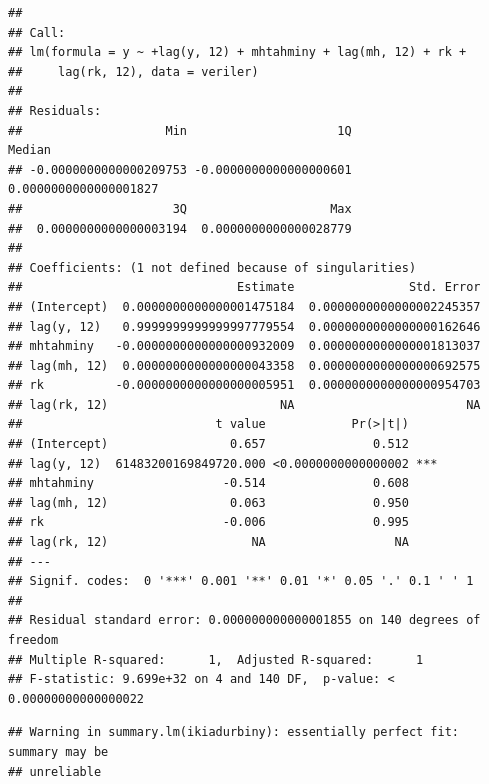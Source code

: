 \documentclass[]{article}
\newenvironment{Shaded}{\begin{snugshade}}{\end{snugshade}}
\newcommand{\KeywordTok}[1]{\textcolor[rgb]{0.13,0.29,0.53}{\textbf{#1}}}
\newcommand{\DecValTok}[1]{\textcolor[rgb]{0.00,0.00,0.81}{#1}}
\newcommand{\StringTok}[1]{\textcolor[rgb]{0.31,0.60,0.02}{#1}}
\newcommand{\OperatorTok}[1]{\textcolor[rgb]{0.81,0.36,0.00}{\textbf{#1}}}
\newcommand{\NormalTok}[1]{#1}
\begin{document}
\begin{verbatim}
## 
## Call:
## lm(formula = y ~ +lag(y, 12) + mhtahminy + lag(mh, 12) + rk + 
##     lag(rk, 12), data = veriler)
## 
## Residuals:
##                    Min                     1Q                 Median 
## -0.0000000000000209753 -0.0000000000000000601  0.0000000000000001827 
##                     3Q                    Max 
##  0.0000000000000003194  0.0000000000000028779 
## 
## Coefficients: (1 not defined because of singularities)
##                              Estimate                Std. Error
## (Intercept)  0.0000000000000001475184  0.0000000000000002245357
## lag(y, 12)   0.9999999999999997779554  0.0000000000000000162646
## mhtahminy   -0.0000000000000000932009  0.0000000000000001813037
## lag(mh, 12)  0.0000000000000000043358  0.0000000000000000692575
## rk          -0.0000000000000000005951  0.0000000000000000954703
## lag(rk, 12)                        NA                        NA
##                           t value            Pr(>|t|)    
## (Intercept)                 0.657               0.512    
## lag(y, 12)  61483200169849720.000 <0.0000000000000002 ***
## mhtahminy                  -0.514               0.608    
## lag(mh, 12)                 0.063               0.950    
## rk                         -0.006               0.995    
## lag(rk, 12)                    NA                  NA    
## ---
## Signif. codes:  0 '***' 0.001 '**' 0.01 '*' 0.05 '.' 0.1 ' ' 1
## 
## Residual standard error: 0.000000000000001855 on 140 degrees of freedom
## Multiple R-squared:      1,  Adjusted R-squared:      1 
## F-statistic: 9.699e+32 on 4 and 140 DF,  p-value: < 0.00000000000000022
\end{verbatim}

\begin{Shaded}
\end{Shaded}

\begin{verbatim}
## Warning in summary.lm(ikiadurbiny): essentially perfect fit: summary may be
## unreliable
\end{verbatim}
\end{document}
